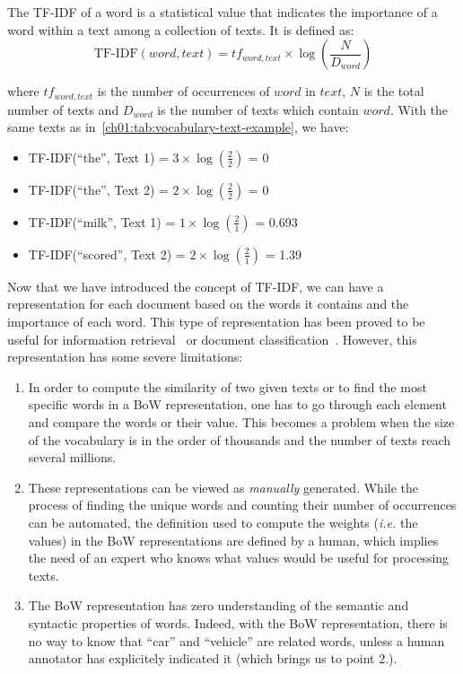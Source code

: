   \theoremstyle{definition}
  \begin{definition}[TF-IDF]
    The TF-IDF of a word is a statistical value that indicates the importance of
    a word within a text among a collection of texts. It is defined as:
    \begin{equation}
      \text{TF-IDF}(word, text) = tf_{word, text} \times
      \log(\frac{N}{D_{word}})
    \end{equation}
    \label{ch01:def:def-tfidf}
  \end{definition}

  \noindent where $tf_{word, text}$ is the number of occurrences of $word$ in
  $text$, $N$ is the total number of texts and $D_{word}$ is the number of texts
  which contain $word$. With the same texts as
  in~\autoref{ch01:tab:vocabulary-text-example}, we have:

  \begin{itemize}
    \item TF-IDF(``the'', Text 1) = $3 \times \log (\frac{2}{2})$ = 0
    \item TF-IDF(``the'', Text 2) = $2 \times \log (\frac{2}{2})$ = 0
    \item TF-IDF(``milk'', Text 1) = $1 \times \log (\frac{2}{1})$ = 0.693
    \item TF-IDF(``scored'', Text 2) = $2 \times \log (\frac{2}{1})$ = 1.39
  \end{itemize}

  \medskip
  Now that we have introduced the concept of TF-IDF, we can have a
  representation for each document based on the words it contains and the
  importance of each word. This type of representation has been proved to be
  useful for information retrieval~\citep{ramos2003using} or document
  classification~\citep{zhang2011comparative}. However, this representation has
  some severe limitations:

  \begin{enumerate}
    \item In order to compute the similarity of two given texts or to find the
      most specific words in a BoW representation, one has to go through each
      element and compare the words or their value. This becomes a problem when
      the size of the vocabulary is in the order of thousands and the number of
      texts reach several millions.
    \item These representations can be viewed as \textit{manually} generated.
      While the process of finding the unique words and counting their number of
      occurrences can be automated, the definition used to compute the weights
      (\textit{i.e.} the values) in the BoW representations are defined by a
      human, which implies the need of an expert who knows what values would be
      useful for processing texts.
    \item The BoW representation has zero understanding of the semantic and
      syntactic properties of words. Indeed, with the BoW representation, there
      is no way to know that ``car'' and ``vehicle'' are related words, unless a
      human annotator has explicitely indicated it (which brings us to point
      2.).
  \end{enumerate}

